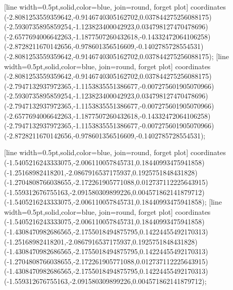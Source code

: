 [line width=0.5pt,solid,color=blue, join=round, forget plot] coordinates {(-2.8081253559359642,-0.9146740305162702,0.037844275256088175) (-2.5930735895859254,-1.123823400042923,0.034798127470478696) (-2.6577694006642263,-1.1877507260432618,-0.14332472064106258) (-2.8728211670142656,-0.978601356516609,-0.1402785728554531) (-2.8081253559359642,-0.9146740305162702,0.037844275256088175)};
[line width=0.5pt,solid,color=blue, join=round, forget plot] coordinates {(-2.8081253559359642,-0.9146740305162702,0.037844275256088175) (-2.7947132937972365,-1.1153835551386677,-0.007275601905070966) (-2.5930735895859254,-1.123823400042923,0.034798127470478696) (-2.7947132937972365,-1.1153835551386677,-0.007275601905070966) (-2.6577694006642263,-1.1877507260432618,-0.14332472064106258) (-2.7947132937972365,-1.1153835551386677,-0.007275601905070966) (-2.8728211670142656,-0.978601356516609,-0.1402785728554531)};

[line width=0.5pt,solid,color=blue, join=round, forget plot] coordinates {(-1.5405216243333075,-2.006110057845731,0.18440993475941858) (-1.25168982418201,-2.0867916537175937,0.1925751848431828) (-1.2704808766038655,-2.172261905771088,0.012737112225643915) (-1.559312676755163,-2.091580309899226,0.004571862141879712) (-1.5405216243333075,-2.006110057845731,0.18440993475941858)};
[line width=0.5pt,solid,color=blue, join=round, forget plot] coordinates {(-1.5405216243333075,-2.006110057845731,0.18440993475941858) (-1.4308470982686565,-2.1755018494875795,0.14224455492170313) (-1.25168982418201,-2.0867916537175937,0.1925751848431828) (-1.4308470982686565,-2.1755018494875795,0.14224455492170313) (-1.2704808766038655,-2.172261905771088,0.012737112225643915) (-1.4308470982686565,-2.1755018494875795,0.14224455492170313) (-1.559312676755163,-2.091580309899226,0.004571862141879712)};


